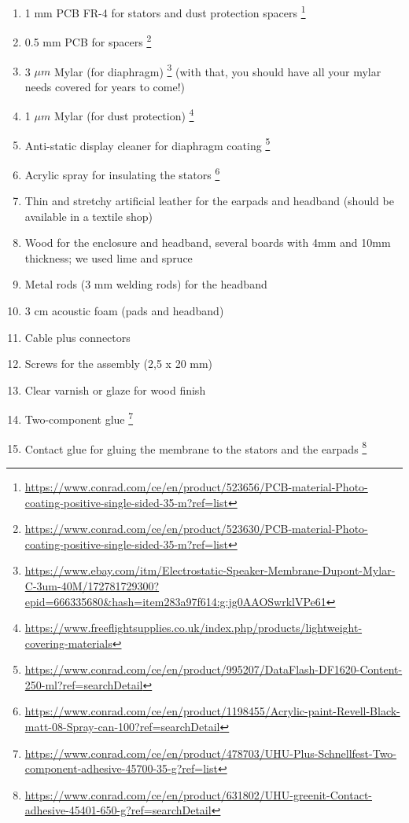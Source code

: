 \documentclass{article}
\begin{document}
\begin{enumerate}
    \item 1 mm PCB FR-4 for stators and dust protection spacers  \footnote{\url{https://www.conrad.com/ce/en/product/523656/PCB-material-Photo-coating-positive-single-sided-35-m?ref=list}}
    \item 0.5 mm PCB for spacers \footnote{\url{https://www.conrad.com/ce/en/product/523630/PCB-material-Photo-coating-positive-single-sided-35-m?ref=list}}
    \item 3 $\mu m$ Mylar (for diaphragm) \footnote{\url{https://www.ebay.com/itm/Electrostatic-Speaker-Membrane-Dupont-Mylar-C-3um-40M/172781729300?epid=666335680&hash=item283a97f614:g:jg0AAOSwrklVPe61}} (with that, you should have all your mylar needs covered for years to come!)
    \item 1 $\mu m$ Mylar (for dust protection) \footnote{\url{https://www.freeflightsupplies.co.uk/index.php/products/lightweight-covering-materials}}
    \item Anti-static display cleaner for diaphragm coating \footnote{\url{https://www.conrad.com/ce/en/product/995207/DataFlash-DF1620-Content-250-ml?ref=searchDetail}}
    \item Acrylic spray for insulating the stators \footnote{\url{https://www.conrad.com/ce/en/product/1198455/Acrylic-paint-Revell-Black-matt-08-Spray-can-100?ref=searchDetail}}
    \item Thin and stretchy artificial leather for the earpads and headband (should be available in a textile shop)
    \item Wood for the enclosure and headband, several boards with 4mm and 10mm thickness; we used lime and spruce
    \item Metal rods (3 mm welding rods) for the headband
    \item 3 cm acoustic foam (pads and headband)
    \item Cable plus connectors
    \item Screws for the assembly (2,5 x 20 mm)
    \item Clear varnish or glaze for wood finish
    \item Two-component glue \footnote{\url{https://www.conrad.com/ce/en/product/478703/UHU-Plus-Schnellfest-Two-component-adhesive-45700-35-g?ref=list}}
    \item Contact glue for gluing the membrane to the stators and the earpads \footnote{\url{https://www.conrad.com/ce/en/product/631802/UHU-greenit-Contact-adhesive-45401-650-g?ref=searchDetail}}

\end{enumerate}
\end{document}
